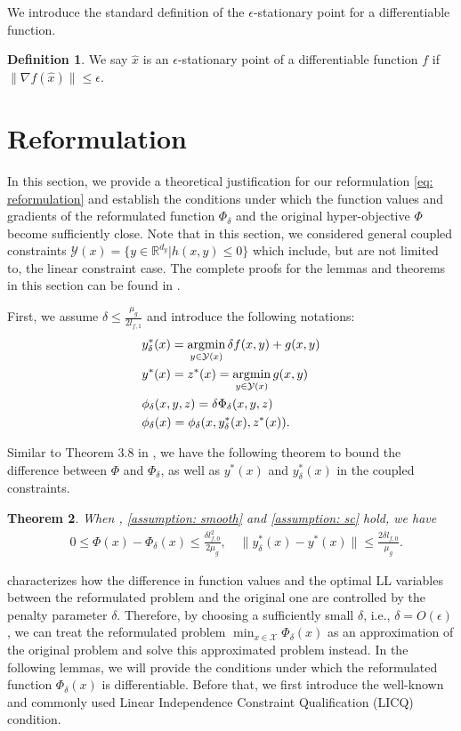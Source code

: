 \documentclass{article}
\newcommand{\Xc}{\mathcal{X}}
\newcommand{\Yc}{\mathcal{Y}}
\def\R{\mathbb{R}}
\newcommand{\argmin}{\mathop{\rm argmin}}
\theoremstyle{plain}
\newtheorem{theorem}{Theorem}[section]
\theoremstyle{definition}
\newtheorem{definition}[theorem]{Definition}
\theoremstyle{remark}
\begin{document}
We introduce the standard definition of the $\epsilon$-stationary point for a differentiable function.
\begin{definition}
\label{def: eps}
We say $\hat{x}$ is an $\epsilon$-stationary point of a differentiable function $f$ if $\|\nabla f(\hat{x})\|\leq\epsilon$.
\end{definition}


\section{Reformulation}\label{section: Reformulation}
In this section, we provide a theoretical justification for our reformulation \eqref{eq: reformulation} and establish the conditions under which the function values and gradients of the reformulated function $\Phi_\delta$ and the original hyper-objective $\Phi$ become sufficiently close. Note that in this section, we considered general coupled constraints $\Yc(x)=\{y\in \R^{d_y} | h(x,y)\leq 0\}$ which include, but are not limited to, the linear constraint case.  The complete proofs for the lemmas and theorems in this section can be found in .

First, we assume $\delta\leq \frac{\mu_g}{2l_{f,1}}$ and introduce the following notations:
\begin{align*}
    &y^*_\delta(x)=\argmin_{y\in \Yc(x)} \delta f(x,y)+g(x,y)\\
    &y^*(x)=z^*(x)=\argmin_{y\in \Yc(x)}  g(x,y) \\
    &\phi_\delta(x,y,z)=\delta\Phi_\delta(x,y,z)\\
    &\phi_\delta(x)=\phi_\delta(x,y^*_\delta(x),z^*(x)).
\end{align*}

Similar to Theorem 3.8 in \cite{kwon2023penalty}, we have the following theorem to bound the difference between $\Phi$ and $\Phi_\delta$, as well as $y^*(x)$ and $y_\delta^*(x)$ in the coupled constraints.
\begin{theorem}\label{thm: reformulation}
When , \ref{assumption: smooth} and \ref{assumption: sc} hold, we have
    \begin{align*}
    &0\leq \Phi(x)-\Phi_\delta(x)\leq \frac{\delta l_{f,0}^2}{2\mu_g}, \quad \|y_\delta^*(x)-y^*(x)\|\leq\frac{2\delta l_{f,0}}{\mu_g}.
    \end{align*}
\end{theorem}
 characterizes how the difference in function values and the optimal LL variables between the reformulated problem and the original one are controlled by the penalty parameter $\delta$. 
Therefore, by choosing a sufficiently small $\delta$, i.e., $\delta=O(\epsilon)$, we can treat the reformulated problem $\min_{x\in \Xc}\Phi_\delta(x)$ as an approximation of the original problem and solve this approximated problem instead. In the following lemmas, we will provide the conditions under which the reformulated function $\Phi_\delta(x)$ is differentiable. Before that, we first introduce the well-known and commonly used Linear Independence Constraint Qualification (LICQ) condition.
\end{document}
